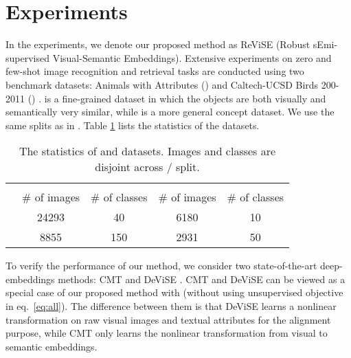 \section{Experiments}
\label{sec:exp}
{
In the experiments, we denote our proposed method as ReViSE (Robust sEmi-supervised Visual-Semantic Embeddings). Extensive experiments on zero and few-shot image recognition and retrieval tasks are conducted using two benchmark datasets: Animals with Attributes () \cite{lampert2014attribute} and Caltech-UCSD Birds 200-2011 () \cite{WelinderEtal2010}.  is a fine-grained dataset in which the objects are both visually and semantically very similar, while  is a more general concept dataset. We use the same  splits as in \cite{akata2015evaluation,xian2016latent}. Table \ref{tbl:dataset_stat} lists the statistics of the datasets.

\begin{table}[t!]
\centering
\caption{\footnotesize The statistics of  and  datasets. Images and classes are disjoint across  /  split.}
\vspace{1mm}
\scalebox{0.8}
{
\begin{tabular}{|c||cc||cc|}
\hline
\multirow{2}{*}{} & \multicolumn{2}{|c||}{} & \multicolumn{2}{c|}{}    \\ 
                         & \# of images          & \# of classes         & \# of images & \# of classes \\ \hline \hline
 \cite{lampert2014attribute}                     & 24293                 & 40                    & 6180         & 10            \\ \cite{WelinderEtal2010}                     & 8855                  & 150                   & 2931         & 50            \\ \hline
\end{tabular}
}
\label{tbl:dataset_stat}
\vspace{-4mm}
\end{table}


To verify the performance of our method, we consider two state-of-the-art deep-embeddings methods: CMT \cite{socher2013zero} and DeViSE \cite{frome2013devise}. CMT and DeViSE can be viewed as a special case of our proposed method with  (without using unsupervised objective in eq.~\eqref{eq:all}). The difference between them is that DeViSE learns a nonlinear transformation on raw visual images and textual attributes for the alignment purpose, while CMT only learns the nonlinear transformation from visual to semantic embeddings. 

}
